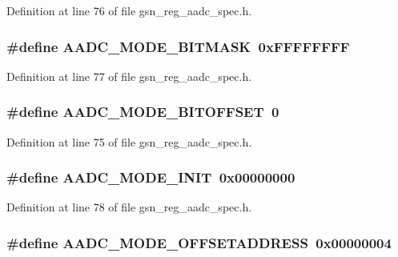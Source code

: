 Definition at line 76 of file gsn\_\-reg\_\-aadc\_\-spec.h.

\hypertarget{a00543_af81c08e73840feb9e937ce6eca36bf30}{
\subsubsection[{AADC\_\-MODE\_\-BITMASK}]{\setlength{\rightskip}{0pt plus 5cm}\#define AADC\_\-MODE\_\-BITMASK~0xFFFFFFFF}}
\label{a00543_af81c08e73840feb9e937ce6eca36bf30}


Definition at line 77 of file gsn\_\-reg\_\-aadc\_\-spec.h.

\hypertarget{a00543_aba816cf8c693280403c25a24e7358e1f}{
\subsubsection[{AADC\_\-MODE\_\-BITOFFSET}]{\setlength{\rightskip}{0pt plus 5cm}\#define AADC\_\-MODE\_\-BITOFFSET~0}}
\label{a00543_aba816cf8c693280403c25a24e7358e1f}


Definition at line 75 of file gsn\_\-reg\_\-aadc\_\-spec.h.

\hypertarget{a00543_ad79d8f595b8ad87bd715c075dff02a70}{
\subsubsection[{AADC\_\-MODE\_\-INIT}]{\setlength{\rightskip}{0pt plus 5cm}\#define AADC\_\-MODE\_\-INIT~0x00000000}}
\label{a00543_ad79d8f595b8ad87bd715c075dff02a70}


Definition at line 78 of file gsn\_\-reg\_\-aadc\_\-spec.h.

\hypertarget{a00543_a6833027d306ecf4b3909f0502e55615a}{
\subsubsection[{AADC\_\-MODE\_\-OFFSETADDRESS}]{\setlength{\rightskip}{0pt plus 5cm}\#define AADC\_\-MODE\_\-OFFSETADDRESS~0x00000004}}
\label{a00543_a6833027d306ecf4b3909f0502e55615a}


